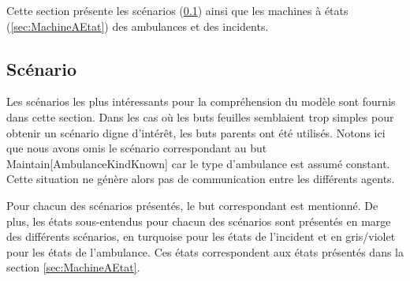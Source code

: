 Cette section présente les scénarios (\ref{sec:scenario}) ainsi que
les machines à états (\ref{sec:MachineAEtat}) des ambulances et des
incidents.

\subsection{Scénario}
\label{sec:scenario}

	Les scénarios les plus intéressants pour la compréhension du modèle sont
	fournis dans cette section.  Dans les cas où les buts feuilles semblaient
	trop simples pour obtenir un scénario digne d'intérêt, les buts parents ont
	été utilisés.  Notons ici que nous avons omis le scénario correspondant au
	but Maintain[AmbulanceKindKnown] car le type d'ambulance est assumé
	constant.  Cette situation ne génère alors pas de communication entre les
	différents agents. 

	Pour chacun des scénarios présentés, le but correspondant est mentionné.
	De plus, les états sous-entendus pour chacun des scénarios sont présentés
	en marge des différents scénarios, en turquoise pour les états de
	l'incident et en gris/violet pour les états de l'ambulance.  Ces états
	correspondent aux états présentés dans la section \ref{sec:MachineAEtat}.

	
	
	
	
	

